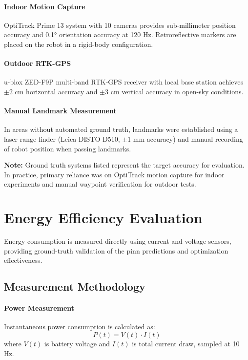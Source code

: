 \paragraph{Indoor Motion Capture}
OptiTrack Prime 13 system with 10 cameras provides sub-millimeter position accuracy and 0.1° orientation accuracy at 120 Hz. Retroreflective markers are placed on the robot in a rigid-body configuration.

\paragraph{Outdoor RTK-GPS}
u-blox ZED-F9P multi-band RTK-GPS receiver with local base station achieves $\pm 2$ cm horizontal accuracy and $\pm 3$ cm vertical accuracy in open-sky conditions.

\paragraph{Manual Landmark Measurement}
In areas without automated ground truth, landmarks were established using a laser range finder (Leica DISTO D510, $\pm 1$ mm accuracy) and manual recording of robot position when passing landmarks.

\textbf{Note:} Ground truth systems listed represent the target accuracy for evaluation. In practice, primary reliance was on OptiTrack motion capture for indoor experiments and manual waypoint verification for outdoor tests.

\section{Energy Efficiency Evaluation}
\label{sec:energy_efficiency}

Energy consumption is measured directly using current and voltage sensors, providing ground-truth validation of the \acrshort{pinn} predictions and optimization effectiveness.

\subsection{Measurement Methodology}

\paragraph{Power Measurement}
Instantaneous power consumption is calculated as:
\begin{equation}
P(t) = V(t) \cdot I(t)
\end{equation}
where $V(t)$ is battery voltage and $I(t)$ is total current draw, sampled at 10 Hz.

